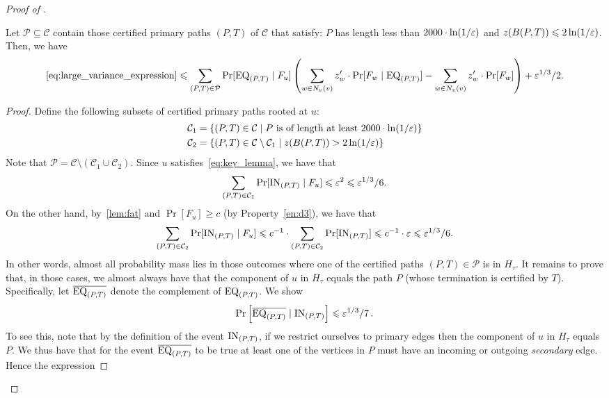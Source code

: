 \begin{proof}[Proof of ]
	\begin{claim}\label{claim:focus-on-EQ} Let  
		$\mathcal{P} \subseteq \mathcal{C}$ contain those certified primary paths $(P,T)$ of $\mathcal{C}$ that satisfy:  $P$ has length less than $2000 \cdot  \ln(1/\varepsilon)$ and  $z(B(P,T)) \leqslant 2\ln(1/\varepsilon)$. Then, we have
		\begin{align*}
		\eqref{eq:large_variance_expression} \leqslant 
		\sum_{(P,T)\in \mathcal{P}}\Pr[\mathrm{EQ}_{(P,T)} \mid F_u] \left(\sum_{w\in N_v(v)} z'_w \cdot \Pr[F_w \mid \mathrm{EQ}_{(P,T)}] - \sum_{w\in N_v(v)} z'_w \cdot \Pr[F_w] \right) + \varepsilon^{1/3}/2.
		\end{align*}
	\end{claim}
	\begin{proof}
		Define the following subsets of certified primary paths rooted at  $u$:
		\begin{align*}
		\mathcal{C}_1 &= \{(P,T)\in \mathcal{C} \mid \mbox{$P$ is of length at least $2000 \cdot \ln(1/\varepsilon)$}\} \\
		\mathcal{C}_2 &= \{(P,T)\in \mathcal{C} \setminus \mathcal{C}_1 \mid \mbox{$z(B(P,T)) > 2\ln(1/\varepsilon)$}\}
		\end{align*}
		Note that $\mathcal{P} = \mathcal{C} \setminus \left( \mathcal{C}_1 \cup \mathcal{C}_2 \right)$.
		Since $u$ satisfies~\eqref{eq:key_lemma}, we have that
		\begin{align*}
		\sum_{(P,T)\in \mathcal{C}_1} \Pr[\mathrm{IN}_{(P,T)} \mid F_u] \leqslant \varepsilon^2 \leqslant \varepsilon^{1/3}/6.
		\end{align*}
		On the other hand, by~\cref{lem:fat} and $\Pr[F_u] \geq c$ (by Property~\eqref{en:d3}), we have that
		\begin{align*}
		\sum_{(P,T)\in \mathcal{C}_2} \Pr[\mathrm{IN}_{(P,T)} \mid F_u] \leqslant c^{-1}\cdot \sum_{(P,T)\in \mathcal{C}_2} \Pr[\mathrm{IN}_{(P,T)}] \leqslant c^{-1} \cdot \varepsilon \leqslant \varepsilon^{1/3}/6.
		\end{align*}
		In other words, almost all probability mass lies in those outcomes where one of the certified paths $(P,T)\in \mathcal{P}$ is in $H_\tau$. It remains to prove that, in those cases, we almost always have that the component of $u$ in $H_\tau$ equals the path $P$ (whose termination is certified by $T$). Specifically, let $\overline{\mathrm{EQ}_{(P,T)}}$ denote the complement of $\mathrm{EQ}_{(P,T)}$. We show
		\begin{align}
		\label{eq:notequal}
		\Pr\left[\overline{\mathrm{EQ}_{(P,T)}}\mid \mathrm{IN}_{(P,T)}\right] \leqslant \varepsilon^{1/3}/7\,.
		\end{align}
		To see this, note that by the definition of the event $\mathrm{IN}_{(P,T)}$, if we restrict ourselves to primary edges then the component of $u$ in $H_\tau$ equals $P$. We thus have that for the event $\overline{\mathrm{EQ}_{(P,T)}}$ to be true at least one of the vertices in $P$ must have an incoming or outgoing \emph{secondary} edge. Hence  the expression

\end{proof}
\end{proof}
